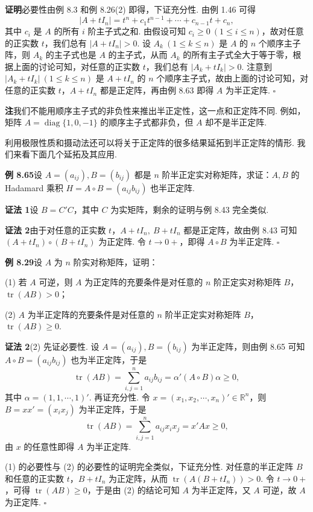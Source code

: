 \documentclass[UTF8,12pt,a4paper,fontset=fandol]{ctexart}
\begin{document}
\noindent\textbf{证明}\quad 必要性由例 8.3 和例 8.26(2) 即得，下证充分性. 由例 1.46 可得
\[
|A+tI_n|=t^n+c_1t^{n-1}+\cdots+c_{n-1}t+c_n,
\]
其中 $c_i$ 是 $A$ 的所有 $i$ 阶主子式之和. 由假设可知 $c_i\ge 0\ (1\le i\le n)$，故对任意的正实数 $t$，我们总有 $|A+tI_n|>0$. 设 $A_k\ (1\le k\le n)$ 是 $A$ 的 $n$ 个顺序主子阵，则 $A_k$ 的主子式也是 $A$ 的主子式，从而 $A_k$ 的所有主子式全大于等于零，根据上面的讨论可知，对任意的正实数 $t$，我们总有 $|A_k+tI_k|>0$. 注意到 $|A_k+tI_k|\ (1\le k\le n)$ 是 $A+tI_n$ 的 $n$ 个顺序主子式，故由上面的讨论可知，对任意的正实数 $t$，$A+tI_n$ 都是正定阵，再由例 8.63 即得 $A$ 为半正定阵. $\ensuremath{\square}$

\noindent\textbf{注}\quad 我们不能用顺序主子式的非负性来推出半正定性，这一点和正定阵不同. 例如，矩阵 $A=\operatorname{diag}\{1,0,-1\}$ 的顺序主子式都非负，但 $A$ 却不是半正定阵.

利用极限性质和摄动法还可以将关于正定阵的很多结果延拓到半正定阵的情形. 我们来看下面几个延拓及其应用.

\noindent\textbf{例 8.65}\quad 设 $A=(a_{ij}),B=(b_{ij})$ 都是 $n$ 阶半正定实对称矩阵，求证：$A,B$ 的 Hadamard 乘积 $H=A\circ B=(a_{ij}b_{ij})$ 也半正定阵.

\noindent\textbf{证法 1}\quad 设 $B=C'C$，其中 $C$ 为实矩阵，剩余的证明与例 8.43 完全类似.

\noindent\textbf{证法 2}\quad 由于对任意的正实数 $t$，$A+tI_n,\ B+tI_n$ 都是正定阵，故由例 8.43 可知 $(A+tI_n)\circ(B+tI_n)$ 为正定阵. 令 $t\to 0+$，即得 $A\circ B$ 为半正定阵. $\ensuremath{\square}$

\noindent\textbf{例 8.29}\quad 设 $A$ 为 $n$ 阶实对称矩阵，证明：

(1) 若 $A$ 可逆，则 $A$ 为正定阵的充要条件是对任意的 $n$ 阶正定实对称矩阵 $B$，$\operatorname{tr}(AB)>0$；

(2) $A$ 为半正定阵的充要条件是对任意的 $n$ 阶半正定实对称矩阵 $B$，$\operatorname{tr}(AB)\ge 0$.

\noindent\textbf{证法 2}\quad (2) 先证必要性. 设 $A=(a_{ij}),B=(b_{ij})$ 为半正定阵，则由例 8.65 可知 $A\circ B=(a_{ij}b_{ij})$ 也为半正定阵，于是
\[
\operatorname{tr}(AB)=\sum_{i,j=1}^n a_{ij}b_{ij}=\alpha'(A\circ B)\alpha\ge 0,
\]
其中 $\alpha=(1,1,\cdots,1)'$. 再证充分性. 令 $x=(x_1,x_2,\cdots,x_n)'\in\mathbb{R}^n$，则 $B=xx'=(x_ix_j)$ 为半正定阵，于是
\[
\operatorname{tr}(AB)=\sum_{i,j=1}^n a_{ij}x_ix_j=x'Ax\ge 0,
\]
由 $x$ 的任意性即得 $A$ 为半正定阵.

(1) 的必要性与 (2) 的必要性的证明完全类似，下证充分性. 对任意的半正定阵 $B$ 和任意的正实数 $t$，$B+tI_n$ 为正定阵，从而 $\operatorname{tr}(A(B+tI_n))>0$. 令 $t\to 0+$，可得 $\operatorname{tr}(AB)\ge 0$，于是由 (2) 的结论可知 $A$ 为半正定阵，又 $A$ 可逆，故 $A$ 为正定阵. $\ensuremath{\square}$
\end{document}
